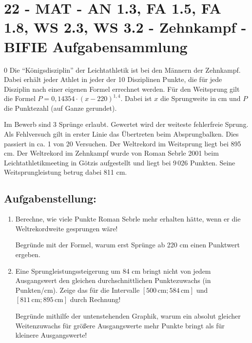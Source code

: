 \section{22 - MAT - AN 1.3, FA 1.5, FA 1.8, WS 2.3, WS 3.2 - Zehnkampf - BIFIE Aufgabensammlung}

\begin{langesbeispiel} \item[0] %
				Die "`Königsdisziplin"' der Leichtathletik ist bei den Männern der Zehnkampf. Dabei erhält jeder Athlet in jeder der 10 Disziplinen Punkte, die für jede Disziplin nach einer eigenen Formel errechnet werden. Für den Weitsprung gilt die Formel $P=0,14354\cdot(x-220)^{1,4}$. Dabei ist $x$ die Sprungweite in cm und $P$ die Punktezahl (auf Ganze gerundet).
				
Im Bewerb sind 3 Sprünge erlaubt. Gewertet wird der weiteste fehlerfreie Sprung. Als Fehlversuch gilt in erster Linie das Übertreten beim Absprungbalken. Dies passiert in ca. 1 von 20 Versuchen. Der Weltrekord im Weitsprung liegt bei 895 cm. Der Weltrekord im Zehnkampf wurde von Roman Sebrle 2001 beim Leichtathletikmeeting in Götzis aufgestellt und liegt bei 9\,026 Punkten. Seine Weitsprungleistung betrug dabei 811 cm. 

\subsection{Aufgabenstellung:}
\begin{enumerate}
	\item Berechne, wie viele Punkte Roman Sebrle mehr erhalten hätte, wenn er die Weltrekordweite gesprungen wäre!
	
	Begründe mit der Formel, warum erst Sprünge ab 220 cm einen Punktwert ergeben.
	
	\item Eine Sprungleistungssteigerung um 84 cm bringt nicht von jedem Ausgangswert den gleichen durchschnittlichen Punktezuwachs (in Punkten/cm). Zeige das für die Intervalle $[500\,\text{cm}; 584\,\text{cm}]$ und $[811\,\text{cm};895\,\text{cm}]$ durch Rechnung!
	
	Begründe mithilfe der untenstehenden Graphik, warum ein absolut gleicher Weitenzuwachs für größere Ausgangswerte mehr Punkte bringt als für kleinere Ausgangswerte!
	

\end{enumerate}
\end{langesbeispiel}
